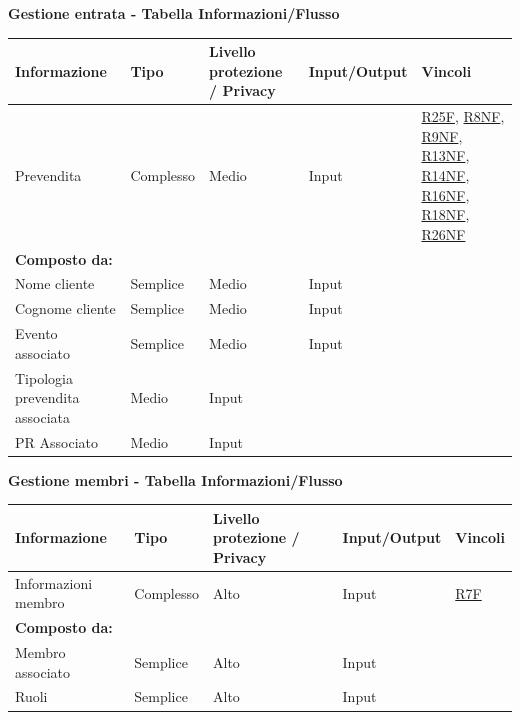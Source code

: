 \documentclass[a4paper]{article}
\begin{document}
\newpage

\textbf{Gestione entrata  - Tabella Informazioni/Flusso}

\begin{center}
    \begin{tabularx}{1\textwidth}{|X|X|X|X|X|}
        \hline
        \textbf{Informazione} &\textbf{Tipo} & \textbf{Livello protezione / Privacy} & \textbf{Input/Output} & \textbf{Vincoli}\\
        \hline
        \hline
        Prevendita & Complesso & Medio & Input & \hyperlink{R25F}{R25F}, \hyperlink{R8NF}{R8NF}, \hyperlink{R9NF}{R9NF}, \hyperlink{R13NF}{R13NF}, \hyperlink{R14NF}{R14NF}, \hyperlink{R16NF}{R16NF}, \hyperlink{R18NF}{R18NF}, \hyperlink{R26NF}{R26NF} \\
        \textbf{Composto da:} & & & & \\
        Nome cliente & Semplice & Medio & Input & \\
        Cognome cliente & Semplice & Medio & Input & \\
        Evento associato & Semplice & Medio & Input & \\
        Tipologia prevendita associata & Medio & Input & \\
        PR Associato & Medio & Input & \\
        \hline
    \end{tabularx}
\end{center}

\textbf{Gestione membri  - Tabella Informazioni/Flusso}

\begin{center}
    \begin{tabularx}{1\textwidth}{|X|X|X|X|X|}
        \hline
        \textbf{Informazione} &\textbf{Tipo} & \textbf{Livello protezione / Privacy} & \textbf{Input/Output} & \textbf{Vincoli}\\
        \hline
        \hline
        Informazioni membro & Complesso & Alto & Input & \hyperlink{R7F}{R7F}\\
        \textbf{Composto da:} & & & & \\
        Membro associato & Semplice & Alto & Input & \\
        Ruoli & Semplice & Alto & Input & \\
        \hline
    \end{tabularx}
\end{center}
\end{document}
